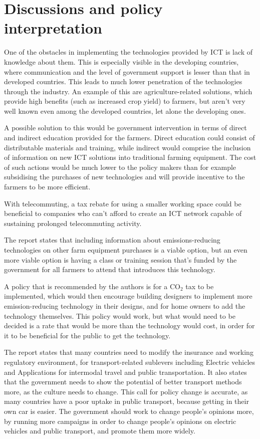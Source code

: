 \section{Discussions and policy interpretation}
One of the obstacles in implementing the technologies provided by ICT is lack of knowledge about them. This is especially visible in the developing countries, where communication and the level of government support is lesser than that in developed countries. This leads to much lower penetration of the technologies through the industry. An example of this are agriculture-related solutions, which provide high benefits (such as increased crop yield) to farmers, but aren’t very well known even among the developed countries, let alone the developing ones.

A possible solution to this would be government intervention in terms of direct and indirect education provided for the farmers. Direct education could consist of distributable materials and training, while indirect would comprise the inclusion of information on new ICT solutions into traditional farming equipment. The cost of such actions would be much lower to the policy makers than for example subsidising the purchases of new technologies and will provide incentive to the farmers to be more efficient.


With telecommuting, a tax rebate for using a smaller working space could be beneficial to companies who can't afford to create an ICT network capable of sustaining prolonged telecommuting activity. 

The report states that including information about emissions-reducing technologies on other farm equipment purchases is a viable option, but an even more viable option is having a class or training session that's funded by the government for all farmers to attend that introduces this technology. 

A policy that is recommended by the authors is for a CO$_2$ tax to be implemented, which would then encourage building designers to implement more emission-reducing technology in their designs, and for home owners to add the technology themselves. This policy would work, but what would need to be decided is a rate that would be more than the technology would cost, in order for it to be beneficial for the public to get the technology.

The report states that many countries need to modify the insurance and working regulatory environment, for transport-related sublevers including Electric vehicles and Applications for intermodal travel and public transportation. It also states that the government needs to show the potential of better transport methods more, as the culture needs to change. This call for policy change is accurate, as many countries have a poor uptake in public transport, because getting in their own car is easier. The government should work to change people's opinions more, by running more campaigns in order to change people's opinions on electric vehicles and public transport, and promote them more widely. 

